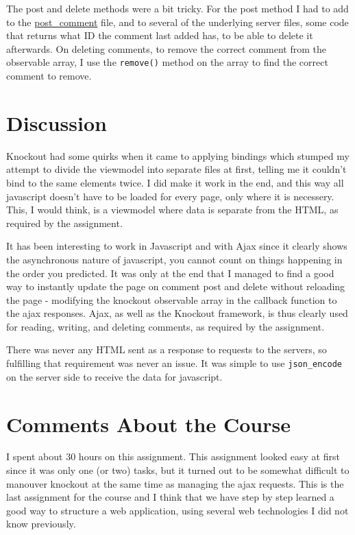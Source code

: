 \documentclass[a4paper]{scrreprt}
\newcommand{\code}[1]{\texttt{#1}}
\begin{document}
The post and delete methods were a bit tricky. For the post method I had to add to the \href{https://github.com/fongie/TastyRecipes/blob/d5a045f5de354d46aa2ed07f5e2d84885910bad4/src/view/requests/post_comment.php#L9}{post\_comment} file, and to several of the underlying server files, some code that returns what ID the comment last added has, to be able to delete it afterwards. On deleting comments, to remove the correct comment from the observable array, I use the \code{remove()} method on the array to find the correct comment to remove.

\chapter{Discussion}

Knockout had some quirks when it came to applying bindings which stumped my attempt to divide the viewmodel into separate files at first, telling me it couldn't bind to the same elements twice. I did make it work in the end, and this way all javascript doesn't have to be loaded for every page, only where it is necessery. This, I would think, is a viewmodel where data is separate from the HTML, as required by the assignment.

It has been interesting to work in Javascript and with Ajax since it clearly shows the asynchronous nature of javascript, you cannot count on things happening in the order you predicted. It was only at the end that I managed to find a good way to instantly update the page on comment post and delete without reloading the page - modifying the knockout observable array in the callback function to the ajax responses. Ajax, as well as the Knockout framework, is thus clearly used for reading, writing, and deleting comments, as required by the assignment.

There was never any HTML sent as a response to requests to the servers, so fulfilling that requirement was never an issue. It was simple to use \code{json\_encode} on the server side to receive the data for javascript.

\chapter{Comments About the Course}

I spent about 30 hours on this assignment.
This assignment looked easy at first since it was only one (or two) tasks, but it turned out to be somewhat difficult to manouver knockout at the same time as managing the ajax requests.
This is the last assignment for the course and I think that we have step by step learned a good way to structure a web application, using several web technologies I did not know previously.
\end{document}
